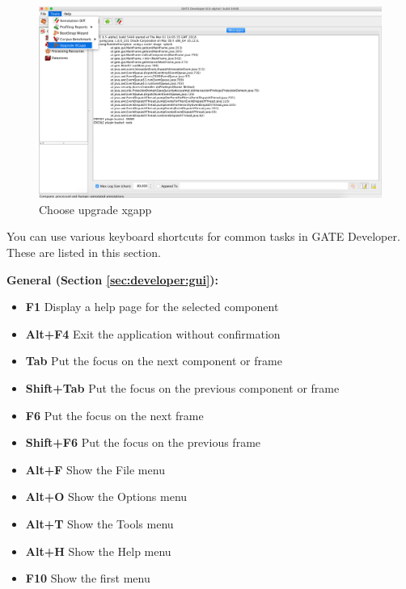 \begin{figure}[htb]
\begin{center}
\includegraphics[scale=0.5]{upgradexgapp.png}
\end{center}
\caption{Choose upgrade xgapp}
\label{fig:pr-init-params}
\end{figure}



You can use various keyboard shortcuts for common tasks in GATE Developer.
These are listed in this section.

{\bf General (Section \ref{sec:developer:gui}):}

\begin{itemize}
\item {\bf F1} Display a help page for the selected component
\item {\bf Alt+F4} Exit the application without confirmation
\item {\bf Tab} Put the focus on the next component or frame
\item {\bf Shift+Tab} Put the focus on the previous component or frame
\item {\bf F6} Put the focus on the next frame
\item {\bf Shift+F6} Put the focus on the previous frame
\item {\bf Alt+F} Show the File menu
\item {\bf Alt+O} Show the Options menu
\item {\bf Alt+T} Show the Tools menu
\item {\bf Alt+H} Show the Help menu
\item {\bf F10} Show the first menu
\end{itemize}


